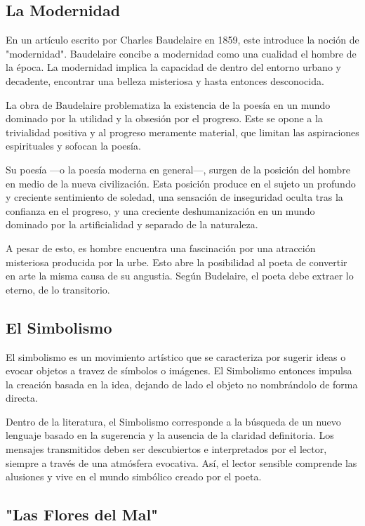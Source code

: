 \documentclass{article}
\begin{document}
\subsection{La Modernidad}

En un artículo escrito por Charles Baudelaire en 1859, este introduce la noción de "modernidad". Baudelaire concibe a modernidad como una cualidad el hombre de la época. La modernidad implica la capacidad de dentro del entorno urbano y decadente, encontrar una belleza misteriosa y hasta entonces desconocida.

La obra de Baudelaire problematiza la existencia de la poesía en un mundo dominado por la utilidad y la obsesión por el progreso. Este se opone a la trivialidad positiva y al progreso meramente material, que limitan las aspiraciones espirituales y sofocan la poesía.

Su poesía ---o la poesía moderna en general---, surgen de la posición del hombre en medio de la nueva civilización. Esta posición produce en el sujeto un profundo y creciente sentimiento de soledad, una sensación de inseguridad oculta tras la confianza en el progreso, y una creciente deshumanización en un mundo dominado por la artificialidad y separado de la naturaleza.

A pesar de esto, es hombre encuentra una fascinación por una atracción misteriosa producida por la urbe. Esto abre la posibilidad al poeta de convertir en arte la misma causa de su angustia. Según Budelaire, el poeta debe extraer lo eterno, de lo transitorio.

\subsection{El Simbolismo}

El simbolismo es un movimiento artístico que se caracteriza por sugerir ideas o evocar objetos a travez de símbolos o imágenes. El Simbolismo entonces impulsa la creación basada en la idea, dejando de lado el objeto no nombrándolo de forma directa.

Dentro de la literatura, el Simbolismo corresponde a la búsqueda de un nuevo lenguaje basado en la sugerencia y la ausencia de la claridad definitoria. Los mensajes transmitidos deben ser descubiertos e interpretados por el lector, siempre a través de una atmósfera evocativa. Así, el lector sensible comprende las alusiones y vive en el mundo simbólico creado por el poeta.

\subsection{"Las Flores del Mal"}
\end{document}
